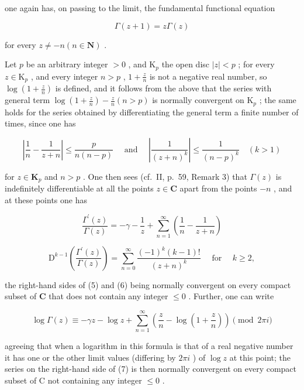 one again has, on passing to the limit, the fundamental functional equation

\[
\Gamma (z + 1) = z \Gamma (z)\tag{4}
\]

for every \(z \neq -n (n \in \mathbf{N})\) .

Let \(p\) be an arbitrary integer \(> 0\) , and \(\mathrm{K}_p\) the open disc \(|z| < p\) ; for every \(z \in \mathrm{K}_p\) , and every integer \(n > p\) , \(1 + \frac{z}{n}\) is not a negative real number, so \(\log \left(1 + \frac{z}{n}\right)\) is defined, and it follows from the above that the series with general term \(\log \left(1 + \frac{z}{n}\right) - \frac{z}{n} (n > p)\) is normally convergent on \(\mathrm{K}_p\) ; the same holds for the series obtained by differentiating the general term a finite number of times, since one has

\[
\left| \frac {1}{n} - \frac {1}{z + n} \right| \leqslant \frac {p}{n (n - p)} \quad \text { and } \quad \left| \frac {1}{(z + n) ^ {k}} \right| \leqslant \frac {1}{(n - p) ^ {k}} \quad (k > 1)
\]

for \(z \in \mathbf{K}_p\) and \(n > p\) . One then sees (cf.~II, p.~59, Remark 3) that \(\Gamma(z)\) is indefinitely differentiable at all the points \(z \in \mathbf{C}\) apart from the points \(-n\) , and at these points one has

\[
{\frac {\Gamma^ {\prime} (z)}{\Gamma (z)}} = - \gamma - {\frac {1}{z}} + \sum_ {n = 1} ^ {\infty} \left({\frac {1}{n}} - {\frac {1}{z + n}}\right)\tag{5}
\]

\[
\mathrm{D} ^ {k - 1} \left(\frac {\Gamma^ {\prime} (z)}{\Gamma (z)}\right) = \sum_ {n = 0} ^ {\infty} \frac {(- 1) ^ {k} (k - 1) !}{(z + n) ^ {k}} \quad \text { for } \quad k \geqslant 2,\tag{6}
\]

the right-hand sides of (5) and (6) being normally convergent on every compact subset of \(\mathbf{C}\) that does not contain any integer \(\leqslant 0\) . Further, one can write

\[
\log \Gamma (z) \equiv - \gamma z - \log z + \sum_ {n = 1} ^ {\infty} \left(\frac {z}{n} - \log \left(1 + \frac {z}{n}\right)\right) \pmod {2 \pi i}\tag{7}
\]

agreeing that when a logarithm in this formula is that of a real negative number it has one or the other limit values (differing by \(2\pi i\) ) of \(\log z\) at this point; the series on the right-hand side of (7) is then normally convergent on every compact subset of C not containing any integer \(\leqslant 0\) .

